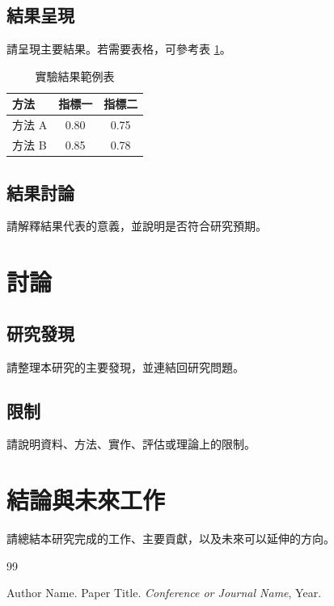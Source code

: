 \documentclass[12pt,a4paper]{article}
\begin{document}
\subsection{結果呈現}
請呈現主要結果。若需要表格，可參考表 \ref{tab:result-example}。

\begin{table}[htbp]
  \centering
  \caption{實驗結果範例表}
  \label{tab:result-example}
  \begin{tabular}{lcc}
    \toprule
    方法 & 指標一 & 指標二 \\
    \midrule
    方法 A & 0.80 & 0.75 \\
    方法 B & 0.85 & 0.78 \\
    \bottomrule
  \end{tabular}
\end{table}

\subsection{結果討論}
請解釋結果代表的意義，並說明是否符合研究預期。

\section{討論}

\subsection{研究發現}
請整理本研究的主要發現，並連結回研究問題。

\subsection{限制}
請說明資料、方法、實作、評估或理論上的限制。

\section{結論與未來工作}
請總結本研究完成的工作、主要貢獻，以及未來可以延伸的方向。

\clearpage
{}
\begin{thebibliography}{99}

Author Name.
\newblock Paper Title.
\newblock \textit{Conference or Journal Name}, Year.

\end{thebibliography}
\end{document}
